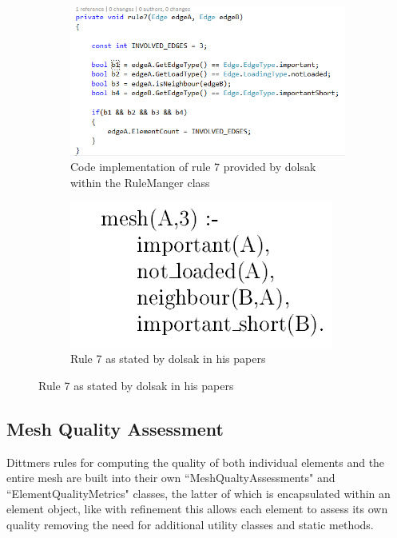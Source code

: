 \begin{figure}[!h]
\centering
\begin{subfigure}{.5\textwidth}
  \centering
  \includegraphics[width=0.9\linewidth]{../Graphics/Rule7Implementation.png}
  \caption{Code implementation of rule 7 provided by dolsak within the RuleManger class}
  \label{fig:sub1}
\end{subfigure}%
\begin{subfigure}{.5\textwidth}
  \centering
  \includegraphics[width=0.7\linewidth]{../Graphics/Rule7Dolsak.png}
  \caption{Rule 7 as stated by dolsak in his papers \cite{appOfILPToFEMeshDesign}}
  \label{fig:sub2}
\end{subfigure}
\label{fig:test}
\end{figure}


\subsection{Mesh Quality Assessment}
Dittmers rules for computing the quality of both individual elements and the entire mesh are built into their own ``MeshQualtyAssessments" and ``ElementQualityMetrics" classes, the latter of which is encapsulated within an element object, like with refinement this allows each element to assess its own quality removing the need for additional utility classes and static methods. \\

